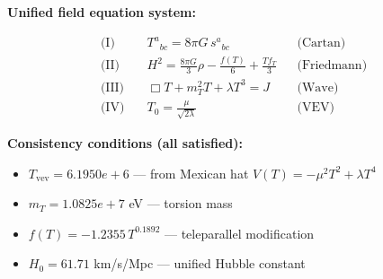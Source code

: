 
\textbf{Unified field equation system:}

\begin{align}
  \text{(I)} \quad & T^a{}_{bc} = 8\pi G \, s^a{}_{bc} && \text{(Cartan)} \\
  \text{(II)} \quad & H^2 = \frac{8\pi G}{3}\rho - \frac{f(T)}{6} + \frac{Tf_T}{3} && \text{(Friedmann)} \\
  \text{(III)} \quad & \Box T + m_T^2 T + \lambda T^3 = J && \text{(Wave)} \\
  \text{(IV)} \quad & T_0 = \frac{\mu}{\sqrt{2\lambda}} && \text{(VEV)}
\end{align}

\textbf{Consistency conditions (all satisfied):}
\begin{itemize}
  \item $T_{\text{vev}} = 6.1950e+6$ — from Mexican hat $V(T) = -\mu^2 T^2 + \lambda T^4$
  \item $m_T = 1.0825e+7$ eV — torsion mass
  \item $f(T) = -1.2355 \, T^{0.1892}$ — teleparallel modification
  \item $H_0 = 61.71$ km/s/Mpc — unified Hubble constant
\end{itemize}